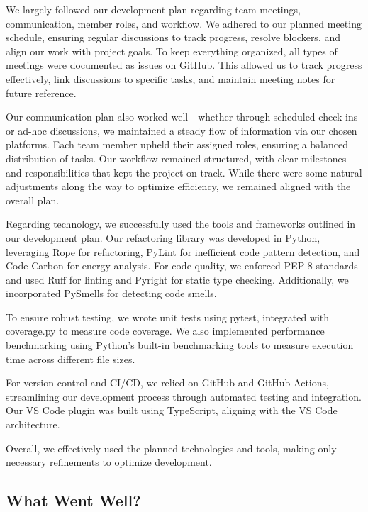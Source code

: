 \documentclass{article}
\begin{document}

We largely followed our development plan regarding team meetings, communication, 
member roles, and workflow. We adhered to our planned meeting schedule, ensuring regular 
discussions to track progress, resolve blockers, and align our work with project goals. 
To keep everything organized, all types of meetings were documented as issues on GitHub. 
This allowed us to track progress effectively, link discussions to specific tasks, and 
maintain meeting notes for future reference.

Our communication plan also worked well—whether through scheduled check-ins or ad-hoc 
discussions, we maintained a steady flow of information via our chosen platforms. Each 
team member upheld their assigned roles, ensuring a balanced distribution of tasks. Our 
workflow remained structured, with clear milestones and responsibilities that kept the 
project on track. While there were some natural adjustments along the way to optimize 
efficiency, we remained aligned with the overall plan.

Regarding technology, we successfully used the tools and frameworks outlined in our 
development plan. Our refactoring library was developed in Python, leveraging Rope for 
refactoring, PyLint for inefficient code pattern detection, and Code Carbon for energy 
analysis. For code quality, we enforced PEP 8 standards and used Ruff for linting and 
Pyright for static type checking. Additionally, we incorporated PySmells for detecting 
code smells.

To ensure robust testing, we wrote unit tests using pytest, integrated with coverage.py 
to measure code coverage. We also implemented performance benchmarking using Python’s 
built-in benchmarking tools to measure execution time across different file sizes.

For version control and CI/CD, we relied on GitHub and GitHub Actions, streamlining 
our development process through automated testing and integration. Our VS Code plugin 
was built using TypeScript, aligning with the VS Code architecture.

Overall, we effectively used the planned technologies and tools, making only necessary 
refinements to optimize development.

\subsection{What Went Well?}
\end{document}
